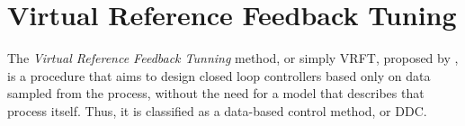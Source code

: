 \chapter{Virtual Reference Feedback Tuning}\label{cap:VRFT}
\vspace{-1cm}



The \textit{Virtual Reference Feedback Tunning} method, or simply VRFT, proposed by \cite{campi2002}, is a procedure that aims to design closed loop controllers based only on data sampled from the process, without the need for a model that describes that process itself. Thus, it is classified as a data-based control method, or DDC.

